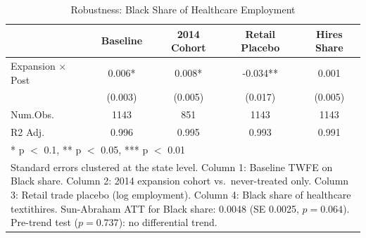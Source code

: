 \begin{table}
\centering
\caption{Robustness: Black Share of Healthcare Employment}
\centering
\label{tab:robustness}
\begin{tabular}[t]{lcccc}
\toprule
  & Baseline & 2014 Cohort & Retail Placebo & Hires Share\\
\midrule
Expansion $\times$ Post & 0.006* & 0.008* & -0.034** & 0.001\\
 & (0.003) & (0.005) & (0.017) & (0.005)\\
\midrule
Num.Obs. & 1143 & 851 & 1143 & 1143\\
R2 Adj. & 0.996 & 0.995 & 0.993 & 0.991\\
\bottomrule
\multicolumn{5}{l}{\rule{0pt}{1em}* p $<$ 0.1, ** p $<$ 0.05, *** p $<$ 0.01}\\
\multicolumn{5}{l}{\parbox{0.85\textwidth}{\small Standard errors clustered at the state level. Column 1: Baseline TWFE on Black share. Column 2: 2014 expansion cohort vs.~never-treated only. Column 3: Retail trade placebo (log employment). Column 4: Black share of healthcare textit{hires}. Sun-Abraham ATT for Black share: 0.0048 (SE 0.0025, $p = 0.064$). Pre-trend test ($p = 0.737$): no differential trend.}}\\
\end{tabular}
\end{table}
